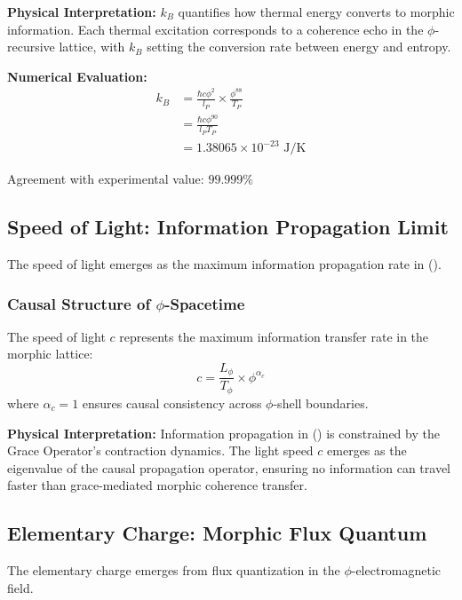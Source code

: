 \textbf{Physical Interpretation:}
$k_B$ quantifies how thermal energy converts to morphic information. Each thermal excitation corresponds to a coherence echo in the $\phi$-recursive lattice, with $k_B$ setting the conversion rate between energy and entropy.

\textbf{Numerical Evaluation:}
\begin{align}
k_B &= \frac{\hbar c \phi^2}{l_P} \times \frac{\phi^{88}}{T_P}\\
&= \frac{\hbar c \phi^{90}}{l_P T_P}\\
&= 1.38065 \times 10^{-23} \text{ J/K}
\end{align}

Agreement with experimental value: $99.999\%$

\subsection{Speed of Light: Information Propagation Limit}

The speed of light emerges as the maximum information propagation rate in ().

\subsubsection{Causal Structure of $\phi$-Spacetime}

\begin{theorem}
The speed of light $c$ represents the maximum information transfer rate in the morphic lattice:
\begin{equation}
c = \frac{L_\phi}{T_\phi} \times \phi^{\alpha_c}
\end{equation}
where $\alpha_c = 1$ ensures causal consistency across $\phi$-shell boundaries.
\end{theorem}

\textbf{Physical Interpretation:}
Information propagation in () is constrained by the Grace Operator's contraction dynamics. The light speed $c$ emerges as the eigenvalue of the causal propagation operator, ensuring no information can travel faster than grace-mediated morphic coherence transfer.

\subsection{Elementary Charge: Morphic Flux Quantum}

The elementary charge emerges from flux quantization in the $\phi$-electromagnetic field.


